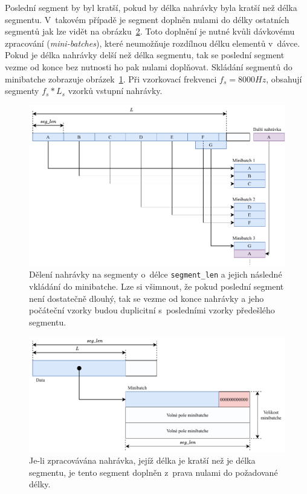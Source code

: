 Poslední segment by byl kratší, pokud by délka nahrávky byla kratší než délka segmentu. V~takovém případě je segment doplněn nulami do délky ostatních segmentů jak lze vidět na obrázku~\ref{fig:segmentace_padding}. Toto doplnění je nutné kvůli dávkovému zpracování (\textit{mini-batches}), které neumožňuje rozdílnou délku elementů v~dávce. Pokud je délka nahrávky delší než délka segmentu, tak se poslední segment vezme od konce bez nutnosti ho pak nulami doplňovat. Skládání segmentů do minibatche zobrazuje obrázek~\ref{fig:minibatch_segmentace}. Při vzorkovací frekvenci $f_s = 8000Hz$, obsahují segmenty $f_s * L_s$ vzorků vstupní nahrávky. 

\begin{figure}[H]
    \centering
    \includegraphics[scale=0.9]{obrazky-figures/minibatch_segmentace.pdf}
    \caption{\label{fig:minibatch_segmentace}Dělení nahrávky na segmenty o~délce \texttt{segment\_len} a jejich následné vkládání do minibatche. Lze si všimnout, že pokud poslední segment není dostatečně dlouhý, tak se vezme od konce nahrávky a jeho počáteční vzorky budou duplicitní s~posledními vzorky předešlého segmentu.}
\end{figure}

\begin{figure}[H]
    \centering
    \includegraphics[scale=0.9]{obrazky-figures/minibatch_segmentace_padding.pdf}
    \caption{\label{fig:segmentace_padding}Je-li zpracovávána nahrávka, jejíž délka je kratší než je délka segmentu, je tento segment doplněn z~prava nulami do požadované délky.}
\end{figure}

